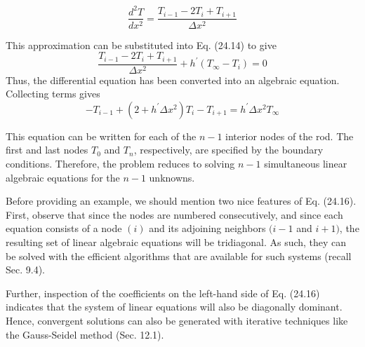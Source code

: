 \documentclass[../main.tex]{subfiles}
\begin{document}
\begin{equation}
    \tag{24.15}
    \frac{d^{2} T}{d x^{2}}=\frac{T_{i-1}-2 T_{i}+T_{i+1}}{\Delta x^{2}}
\end{equation}

\noindent This approximation can be substituted into Eq. (24.14) to give
$$
\frac{T_{i-1}-2 T_{i}+T_{i+1}}{\Delta x^{2}}+h^{\prime}\left(T_{\infty}-T_{i}\right)=0
$$
Thus, the differential equation has been converted into an algebraic equation. Collecting terms gives
\begin{equation}
    \tag{24.16}
    -T_{i-1}+\left(2+h^{\prime} \Delta x^{2}\right) T_{i}-T_{i+1}=h^{\prime} \Delta x^{2} T_{\infty}
\end{equation}

\noindent This equation can be written for each of the $n-1$ interior nodes of the rod. The first and last nodes $T_{0}$ and $T_{n}$, respectively, are specified by the boundary conditions. Therefore, the problem reduces to solving $n-1$ simultaneous linear algebraic equations for the $n-1$ unknowns.

Before providing an example, we should mention two nice features of Eq. (24.16). First, observe that since the nodes are numbered consecutively, and since each equation consists of a node $(i)$ and its adjoining neighbors $(i-1$ and $i+1)$, the resulting set of linear algebraic equations will be tridiagonal. As such, they can be solved with the efficient algorithms that are available for such systems (recall Sec. 9.4).

Further, inspection of the coefficients on the left-hand side of Eq. (24.16) indicates that the system of linear equations will also be diagonally dominant. Hence, convergent solutions can also be generated with iterative techniques like the Gauss-Seidel method (Sec. 12.1).
\end{document}
